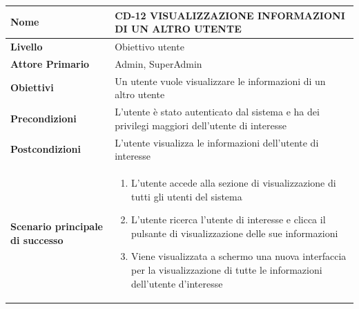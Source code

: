 \begin{center}
    \begin{tabular}{|p{0.3\linewidth}|p{0.7\linewidth}|}
    \hline
    \rowcolor{Blue}
    \textbf{Nome} & CD-12 VISUALIZZAZIONE INFORMAZIONI DI UN ALTRO UTENTE \\
    \hline
    \rowcolor{DarkBlue}
    \textbf{Livello} & Obiettivo utente \\
    \hline
    \rowcolor{LightBlue}
    \textbf{Attore Primario} & Admin, SuperAdmin \\
    \hline
    \rowcolor{LightBlue}
    \textbf{Obiettivi} & Un utente vuole visualizzare le informazioni di un altro utente \\
    \hline
    \rowcolor{Blue}
    \textbf{Precondizioni} & L’utente è stato autenticato dal sistema e ha dei privilegi maggiori dell’utente di interesse \\
    \hline
    \rowcolor{LightBlue}
    \textbf{Postcondizioni} & L’utente visualizza le informazioni dell’utente di interesse \\
    \hline
    \rowcolor{LighterBlue}
        \begin{center}
        \textbf{Scenario principale di successo}
    \end{center} 
    & 
    \begin{enumerate}
        \item L’utente accede alla sezione di visualizzazione di tutti gli utenti del sistema
        \item L’utente ricerca l’utente di interesse e clicca il pulsante di visualizzazione delle sue informazioni
        \item Viene visualizzata a schermo una nuova interfaccia per la visualizzazione di tutte le informazioni dell’utente d’interesse
    \end{enumerate}
    \\
    \hline
    \end{tabular}
\end{center}

